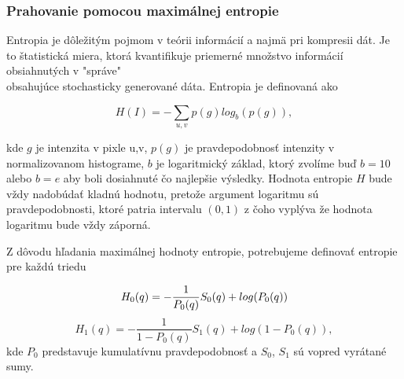 \documentclass[a4paper,11pt,oneside]{article}%
\begin{document}

\subsubsection{Prahovanie pomocou maximálnej entropie} \label{kapurM}

Entropia je dôležitým pojmom v teórii informácií a najmä pri kompresii dát. Je to štatistická miera, ktorá kvantifikuje priemerné množstvo informácií obsiahnutých v  "správe" \\ obsahujúce stochasticky generované dáta. Entropia je definovaná ako

\begin{equation}
H(I)= -\sum_{u,v} p(g)log_b(p(g)),
\end{equation}

kde $g$ je intenzita v pixle u,v, $p(g)$ je pravdepodobnosť intenzity v normalizovanom histograme, $b$ je logaritmický základ, ktorý zvolíme buď $b=10$ alebo $b=e$ aby boli dosiahnuté čo najlepšie výsledky. Hodnota entropie $H$ bude vždy nadobúdať kladnú hodnotu, pretože argument logaritmu sú pravdepodobnosti, ktoré patria intervalu $(0,1)$ z čoho vyplýva že hodnota logaritmu bude vždy záporná. 

Z dôvodu hľadania maximálnej hodnoty entropie, potrebujeme definovať entropie pre každú triedu

\begin{equation}
H_0(q) =  -\frac{1}{P_0(q)}S_0(q)+log(P_0(q)) \\
\end{equation}
\begin{equation}
H_1(q) =  -\frac{1}{1-P_0(q)}S_1(q)+log(1-P_0(q)),
\end{equation}
kde $P_0$ predstavuje kumulatívnu pravdepodobnosť a $S_0$, $S_1$ sú vopred vyrátané sumy. 
 
\end{document}

